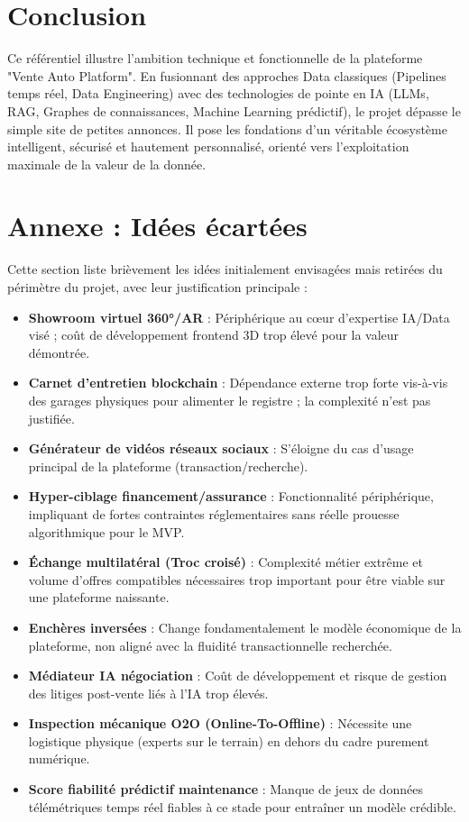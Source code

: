 \documentclass[11pt,a4paper]{article}
\begin{document}
\section{Conclusion}
Ce référentiel illustre l'ambition technique et fonctionnelle de la plateforme "Vente Auto Platform". En fusionnant des approches Data classiques (Pipelines temps réel, Data Engineering) avec des technologies de pointe en IA (LLMs, RAG, Graphes de connaissances, Machine Learning prédictif), le projet dépasse le simple site de petites annonces. Il pose les fondations d'un véritable écosystème intelligent, sécurisé et hautement personnalisé, orienté vers l'exploitation maximale de la valeur de la donnée.

\newpage
\appendix
\section{Annexe : Idées écartées}
Cette section liste brièvement les idées initialement envisagées mais retirées du périmètre du projet, avec leur justification principale :

\begin{itemize}
    \item \textbf{Showroom virtuel 360°/AR} : Périphérique au cœur d'expertise IA/Data visé ; coût de développement frontend 3D trop élevé pour la valeur démontrée.
    \item \textbf{Carnet d'entretien blockchain} : Dépendance externe trop forte vis-à-vis des garages physiques pour alimenter le registre ; la complexité n'est pas justifiée.
    \item \textbf{Générateur de vidéos réseaux sociaux} : S'éloigne du cas d'usage principal de la plateforme (transaction/recherche).
    \item \textbf{Hyper-ciblage financement/assurance} : Fonctionnalité périphérique, impliquant de fortes contraintes réglementaires sans réelle prouesse algorithmique pour le MVP.
    \item \textbf{Échange multilatéral (Troc croisé)} : Complexité métier extrême et volume d'offres compatibles nécessaires trop important pour être viable sur une plateforme naissante.
    \item \textbf{Enchères inversées} : Change fondamentalement le modèle économique de la plateforme, non aligné avec la fluidité transactionnelle recherchée.
    \item \textbf{Médiateur IA négociation} : Coût de développement et risque de gestion des litiges post-vente liés à l'IA trop élevés.
    \item \textbf{Inspection mécanique O2O (Online-To-Offline)} : Nécessite une logistique physique (experts sur le terrain) en dehors du cadre purement numérique.
    \item \textbf{Score fiabilité prédictif maintenance} : Manque de jeux de données télémétriques temps réel fiables à ce stade pour entraîner un modèle crédible.
\end{itemize}
\end{document}
